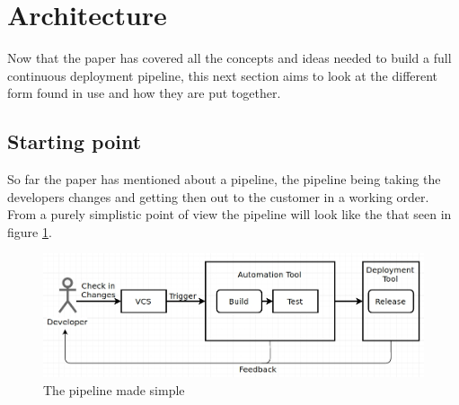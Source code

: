 %
%
%
%
%
%

\section{Architecture}

Now that the paper has covered all the concepts and ideas needed to build a full continuous deployment pipeline, this next section aims to look at the different form found in use and how they are put together.


\subsection{Starting point}

So far the paper has mentioned about a pipeline, the pipeline being taking the developers changes and getting then out to the customer in a working order. From a purely simplistic point of view the pipeline will look like the that seen in figure \ref{fig:pipeline-simple}.

\begin{figure}[H]
	\centering
	\includegraphics[scale=0.45]{images/pipeline-simple.jpg}
	\caption{The pipeline made simple}
	\label{fig:pipeline-simple}
\end{figure}

